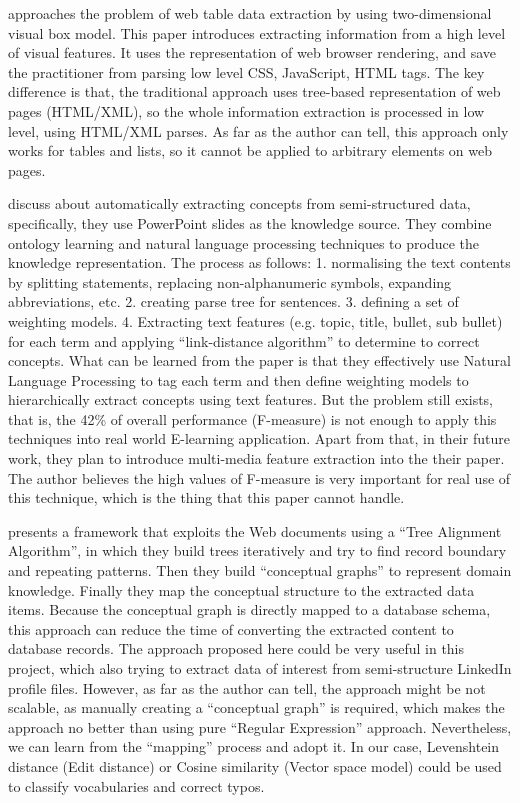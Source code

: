 \cite{gatterbauer2007} approaches the problem of web table data extraction by using two-dimensional visual box model. This paper introduces extracting information from a high level of visual features. It uses the representation of web browser rendering, and save the practitioner from parsing low level CSS, JavaScript, HTML tags. The key difference is that, the traditional approach uses tree-based representation of web pages (HTML/XML), so the whole information extraction is processed in low level, using HTML/XML parses. As far as the author can tell, this approach only works for tables and lists, so it cannot be applied to arbitrary elements on web pages.

\cite{atapattu2012} discuss about automatically extracting concepts from semi-structured data, specifically, they use PowerPoint slides as the knowledge source. They combine ontology learning and natural language processing techniques to produce the knowledge representation. The process as follows: 1. normalising the text contents by splitting statements, replacing non-alphanumeric symbols, expanding abbreviations, etc. 2. creating parse tree for sentences. 3. defining a set of weighting models. 4. Extracting text features (e.g. topic, title, bullet, sub bullet) for each term and applying ``link-distance algorithm'' to determine to correct concepts. What can be learned from the paper is that they effectively use Natural Language Processing to tag each term and then define weighting models to hierarchically extract concepts using text features. But the problem still exists, that is, the 42\% of overall performance (F-measure) is not enough to apply this techniques into real world E-learning application. Apart from that, in their future work, they plan to introduce multi-media feature extraction into the their paper. The author believes the high values of F-measure is very important for real use of this technique, which is the thing that this paper cannot handle.

\cite{hemnani2002} presents a framework that exploits the Web documents using a ``Tree Alignment Algorithm'', in which they build trees iteratively and try to find record boundary and repeating patterns. Then they build ``conceptual graphs'' to represent domain knowledge. Finally they map the conceptual structure to the extracted data items. Because the conceptual graph is directly mapped to a database schema, this approach can reduce the time of converting the extracted content to database records. The approach proposed here could be very useful in this project, which also trying to extract data of interest from semi-structure LinkedIn profile files. However, as far as the author can tell, the approach might be not scalable, as manually creating a ``conceptual graph'' is required, which makes the approach no better than using pure ``Regular Expression'' approach. Nevertheless, we can learn from the ``mapping'' process and adopt it. In our case, Levenshtein distance (Edit distance) or Cosine similarity (Vector space model) could be used to classify vocabularies and correct typos. 

